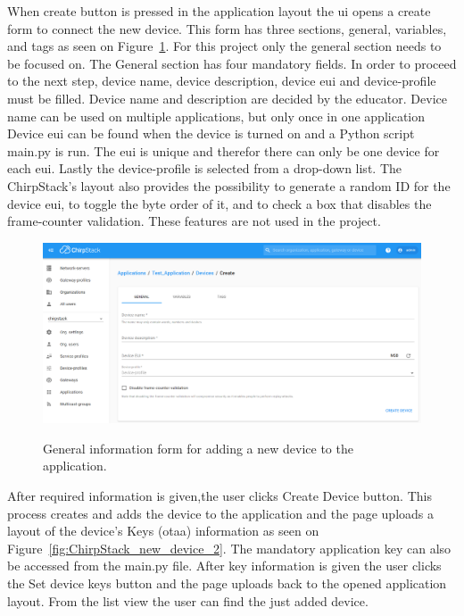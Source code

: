 When create button is pressed in the application layout the \gls{ui} opens a create form to connect the new device.
This form has three sections, general, variables, and tags as seen on Figure~\ref{fig:ChirpStack_new_device}.
For this project only the general section needs to be focused on.
The General section has four mandatory fields.
In order to proceed to the next step, device name, device description, device \gls{eui} and device-profile must be filled.
Device name and description are decided by the educator.
Device name can be used on multiple applications, but only once in one application
Device \gls{eui} can be found when the device is turned on and a Python script main.py is run.
The \gls{eui} is unique and therefor there can only be one device for each \gls{eui}.
Lastly the device-profile is selected from a drop-down list.
The ChirpStack's layout also provides the possibility to generate a random ID for the device \gls{eui}, to toggle the byte order of it, and to check a box that disables the frame-counter validation.
These features are not used in the project.

\begin{figure}[ht]
  \centering
  {\includegraphics[width=\textwidth]{illustration/ChirpStack_new_device.png}}
  \caption{General information form for adding a new device to the application.}
  \label{fig:ChirpStack_new_device}
\end{figure}

After required information is given,the user clicks Create Device button.
This process creates and adds the device to the application and the page uploads a layout of the device's Keys (\gls{otaa}) information as seen on Figure~\ref{fig:ChirpStack_new_device_2}.
The mandatory application key can also be accessed from the main.py file.
After key information is given the user clicks the Set device keys button and the page uploads back to the opened application layout.
From the list view the user can find the just added device.

